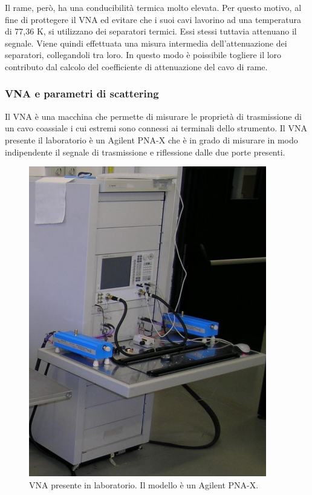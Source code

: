 Il rame, però, ha una conducibilità termica molto elevata. Per questo motivo, al fine di prottegere il VNA ed evitare che i suoi cavi lavorino ad una temperatura di 77,36 K, si utilizzano dei separatori termici. Essi stessi tuttavia attenuano il segnale. Viene quindi effettuata una misura intermedia dell'attenuazione dei separatori, collegandoli tra loro. In questo modo è poissibile togliere il loro contributo dal calcolo del coefficiente di attenuazione del cavo di rame.
\subsubsection{VNA e parametri di scattering}
Il VNA è una macchina che permette di misurare le proprietà di trasmissione di un cavo coassiale i cui estremi sono connessi ai terminali dello strumento. Il VNA presente il laboratorio è un Agilent PNA-X che è in grado di misurare in modo indipendente il segnale di trasmissione e riflessione dalle due porte presenti.
\begin{figure}[h]
\includegraphics[scale=0.60]{VNA.png}
\centering
\caption{VNA presente in laboratorio. Il modello è un Agilent PNA-X.}
\label{fig:VNA}
\end{figure}

